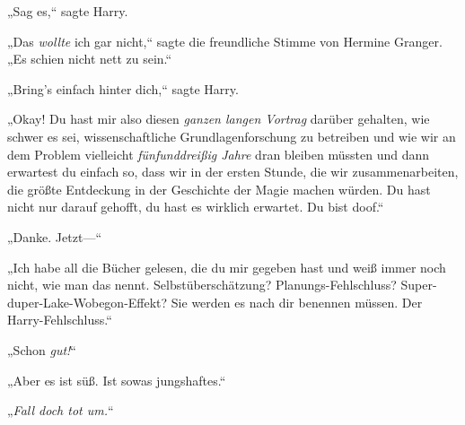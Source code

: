 „Sag es,“ sagte Harry.

„Das \emph{wollte} ich gar nicht,“ sagte die freundliche Stimme von Hermine Granger. „Es schien nicht nett zu sein.“

„Bring's einfach hinter dich,“ sagte Harry.

„Okay! Du hast mir also diesen \emph{ganzen langen Vortrag} darüber gehalten, wie schwer es sei, wissenschaftliche Grundlagenforschung zu betreiben und wie wir an dem Problem vielleicht \emph{fünfunddreißig Jahre} dran bleiben müssten und dann erwartest du einfach so, dass wir in der ersten Stunde, die wir zusammenarbeiten, die größte Entdeckung in der Geschichte der Magie machen würden. Du hast nicht nur darauf gehofft, du hast es wirklich erwartet. Du bist doof.“

„Danke. Jetzt—“

„Ich habe all die Bücher gelesen, die du mir gegeben hast und weiß immer noch nicht, wie man das nennt. Selbstüberschätzung? Planungs-Fehlschluss? Super-duper-Lake-Wobegon-Effekt? Sie werden es nach dir benennen müssen. Der Harry-Fehlschluss.“%

„Schon \emph{gut!}“

„Aber es ist süß. Ist sowas jungshaftes.“

„\emph{Fall doch tot um.}“

